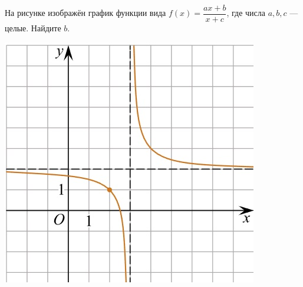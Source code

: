 \begin{class}[number=6]
\begin{listofex}
\begin{minipage}[c]{0.1\textwidth}
		\end{minipage}
		\item
		\begin{minipage}[t]{0.43\textwidth}
			На рисунке изображён график функции вида \(f(x)=\dfrac{ax+b}{x+c}\), где числа \(a, b, c\) --- целые. Найдите \(b\).
		\end{minipage}
		\begin{minipage}[c]{0.1\textwidth}
			\includegraphics[align=t, width=\textwidth]{pics/G101M4C6-7.jpg}
		\end{minipage}
	\end{listofex}
\end{class}
%
%
%	
